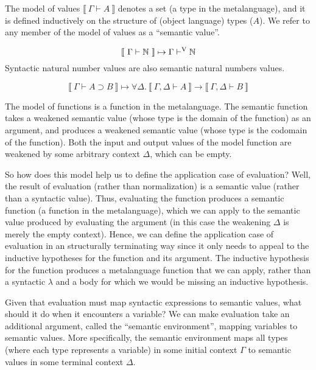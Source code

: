 \documentclass{llncs}
\newenvironment{mydefinition}[3]
{ \begin{mydefinition'}[#1] \label{def:#2}
  \hfill\break
  #3
}
{ \end{mydefinition'} }
\def\dfn{\mapsto}
\def\arr{\supset}
\def\marr{\rightarrow}
\def\nat{\mathbb{N}}
\newcommand{\turn}[1]{\vdash^\con{#1}}
\newcommand{\all}[1]{\forall#1.~}
\newcommand{\els}[1]{\llbracket ~ #1 ~ \rrbracket}
\newcommand{\con}[1]{\textmd{#1}}
\newcommand{\typm}[1]{\els{\Gamma \vdash #1}}
\newcommand{\gdtypm}[1]{\els{\Gamma, \Delta \vdash #1}}
\newcommand{\typv}[1]{\Gamma \turn{V} #1}
\begin{document}
\begin{mydefinition}{Semantic Values}{mval}
{
The model of values $\typm{A}$ denotes a set (a type in the
metalanguage), and it is defined inductively on the structure
of (object language) types ($A$). We refer to any member of the model
of values as a ``semantic value''.
}

\begin{mycase}
$$
\typm{\nat} \dfn \typv{\nat}
$$
Syntactic natural number values are also semantic natural numbers
values.
\end{mycase}

\begin{mycase}[Functions]
$$
\typm{A \arr B} \dfn \all{\Delta} \gdtypm{A} \marr \gdtypm{B}
$$

The model of functions is a function in the metalanguage.
The semantic function takes a weakened semantic value (whose type is
the domain of the function) as an argument, and produces a
weakened semantic value (whose type is the codomain of the
function). Both the input and output values of the model function are
weakened by some arbitrary context $\Delta$, which can be empty.
\end{mycase}

\end{mydefinition}

So how does this model help us to define the application case of
evaluation? Well, the result of evaluation (rather than
normalization) is a semantic value (rather than a syntactic value).
Thus, evaluating the function produces a semantic
function (a function in the metalanguage), which we can apply to the semantic value produced by evaluating
the argument (in this case the weakening $\Delta$ is merely the empty
context). Hence, we can define the application case of evaluation in
an structurally terminating way since it only needs to appeal to the
inductive hypotheses for the function and its argument. The inductive
hypothesis for the function produces a metalanguage function that we
can apply, rather than a syntactic $\lambda$ and a body for which we
would be missing an inductive hypothesis.

Given that evaluation must map syntactic expressions to semantic values,
what should it do when it encounters a variable? We can make
evaluation take an additional argument, called the
``semantic environment'', mapping variables to semantic values. More
specifically, the semantic environment maps all types (where each type
represents a variable) in some initial context $\Gamma$ to semantic
values in some terminal context $\Delta$.
\end{document}
